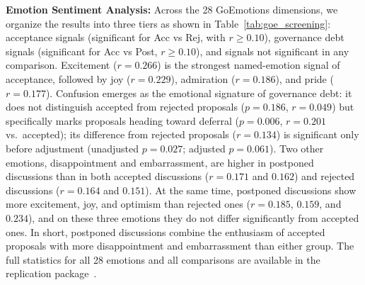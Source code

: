 \documentclass[conference]{IEEEtran}
\begin{document}
\textbf{Emotion Sentiment Analysis:} Across the 28 GoEmotions dimensions, we organize the results into three tiers as shown in Table~\ref{tab:goe_screening}: acceptance signals (significant for Acc vs Rej, with $r \geq 0.10$), governance debt signals (significant for Acc vs Post, $r \geq 0.10$), and signals not significant in any comparison. Excitement ($r = 0.266$) is the strongest named-emotion signal of acceptance, followed by joy ($r = 0.229$), admiration ($r = 0.186$), and pride ($r = 0.177$). Confusion emerges as the emotional signature of governance debt: it does not distinguish accepted from rejected proposals ($p = 0.186$, $r = 0.049$) but specifically marks proposals heading toward deferral ($p = 0.006$, $r = 0.201$ vs.\ accepted); its difference from rejected proposals ($r = 0.134$) is significant only before adjustment (unadjusted $p = 0.027$; adjusted $p = 0.061$). Two other emotions, disappointment and embarrassment, are higher in postponed discussions than in both accepted discussions ($r = 0.171$ and $0.162$) and rejected discussions ($r = 0.164$ and $0.151$). At the same time, postponed discussions show more excitement, joy, and optimism than rejected ones ($r = 0.185$, $0.159$, and $0.234$), and on these three emotions they do not differ significantly from accepted ones. In short, postponed discussions combine the enthusiasm of accepted proposals with more disappointment and embarrassment than either group. The full statistics for all 28 emotions and all comparisons are available in the replication package~\cite{rrgc2026}.
\end{document}
